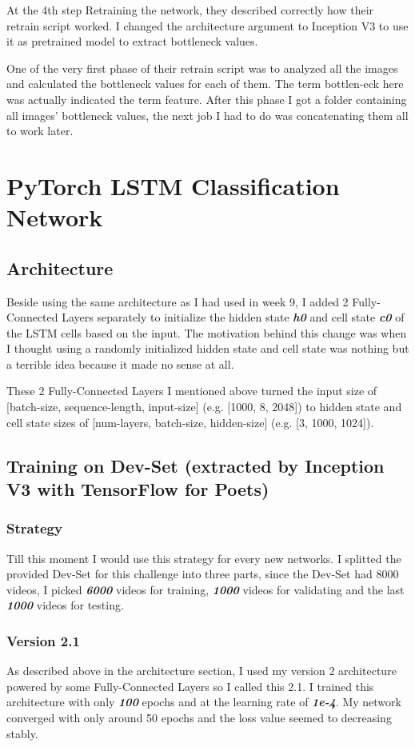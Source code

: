 At the 4th step Retraining the network, they described correctly how their retrain script worked. I changed the architecture argument to Inception V3 to use it as pretrained model to extract bottleneck values. 

One of the very first phase of their retrain script  was to analyzed all the images and calculated the bottleneck values for each of them. The term bottlen-eck here was actually indicated the term feature. After this phase I got a folder containing all images' bottleneck values, the next job I had to do was concatenating them all to work later.

\section{PyTorch LSTM Classification Network}
\subsection{Architecture}
Beside using the same architecture as I had used in week 9, I added 2 Fully-Connected Layers separately to initialize the hidden state \textbf{\emph{h0}} and cell state \textbf{\emph{c0}} of the LSTM cells based on the input. The motivation behind this change was when I thought using a randomly initialized hidden state and cell state was nothing but a terrible idea because it made no sense at all.

These 2 Fully-Connected Layers I mentioned above turned the input size of [batch-size, sequence-length, input-size] (e.g. [1000, 8, 2048]) to hidden state and cell state sizes of [num-layers, batch-size, hidden-size] (e.g. [3, 1000, 1024]).

\subsection{Training on Dev-Set (extracted by Inception V3 with TensorFlow for Poets)}
\subsubsection{Strategy}
Till this moment I would use this strategy for every new networks. I splitted the provided Dev-Set for this challenge into three parts, since the Dev-Set had 8000 videos, I picked \textbf{\emph{6000}} videos for training, \textbf{\emph{1000}} videos for validating and the last \textbf{\emph{1000}} videos for testing.

\subsubsection{Version 2.1}
As described above in the architecture section, I used my version 2 architecture powered by some Fully-Connected Layers so I called this 2.1. I trained this architecture with only \textbf{\emph{100}} epochs and at the learning rate of \textbf{\emph{1e-4}}. My network converged with only around 50 epochs and the loss value seemed to decreasing stably.

